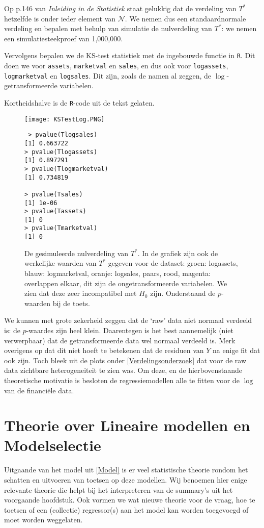 \documentclass[a4paper]{report}
\begin{document}
   Op p.146 van \emph{Inleiding in de Statistiek} staat gelukkig dat de verdeling van $T^*$ hetzelfde is onder ieder element van $\mathcal{N}$. We nemen dus een standaardnormale verdeling en bepalen met behulp van simulatie de nulverdeling van $T^*$: we nemen een simulatiesteekproef van 1,000,000.

  Vervolgens bepalen we de KS-test statistiek met de ingebouwde functie in \verb!R!. Dit doen we voor \verb!assets!, \verb!marketval! en \verb!sales!, en dus ook voor \verb!logassets!, \verb!logmarketval! en \verb!logsales!. Dit zijn, zoals de namen al zeggen, de $\log$-getransformeerde variabelen.
  
  Kortheidshalve is de \verb!R!-code uit de tekst gelaten.
  
  \begin{figure}[H]
  \begin{center}
  \texttt{[image: KSTestLog.PNG]}
  \begin{multicols}{2}
  \begin{verbatim}
 > pvalue(Tlogsales)
[1] 0.663722
> pvalue(Tlogassets)
[1] 0.897291
> pvalue(Tlogmarketval)
[1] 0.734819

> pvalue(Tsales)
[1] 1e-06
> pvalue(Tassets)
[1] 0
> pvalue(Tmarketval)
[1] 0
  \end{verbatim}
  \end{multicols}
  \end{center}
  \caption{De gesimuleerde nulverdeling van $T^*$. In de grafiek zijn ook de werkelijke waarden van $T^*$ gegeven voor de dataset: groen: logassets, blauw: logmarketval, oranje: logsales, paars, rood, magenta: overlappen elkaar, dit zijn de ongetransformeerde variabelen. We zien dat deze zeer incompatibel met $H_0$ zijn. Onderstaand de $p$-waarden bij de toets.}
  \end{figure}   
  
  We kunnen met grote zekerheid zeggen dat de `raw' data niet normaal verdeeld is: de $p$-waardes zijn heel klein. Daarentegen is het best aannemelijk (niet verwerpbaar) dat de getransformeerde data wel normaal verdeeld is. Merk overigens op dat dit niet hoeft te betekenen dat de residuen van $Y$ na enige fit dat ook zijn. Toch bleek uit de plots onder \ref{Verdelingsonderzoek} dat voor de raw data zichtbare heterogeneiteit te zien was. Om deze, en de hierbovenstaande theoretische motivatie is besloten de regressiemodellen alle te fitten voor de $\log$ van de financi\"ele data.

\chapter{Theorie over Lineaire modellen en Modelselectie}
\label{modelselectie}
  Uitgaande van het model uit \ref{Model} is er veel statistische theorie rondom het schatten en uitvoeren van toetsen op deze modellen. Wij benoemen hier enige relevante theorie die helpt bij het interpreteren van de summary's uit het voorgaande hoofdstuk. Ook vormen we wat nieuwe theorie voor de vraag, hoe te toetsen of een (collectie) regressor(s) aan het model kan worden toegevoegd of moet worden weggelaten.
\end{document}
